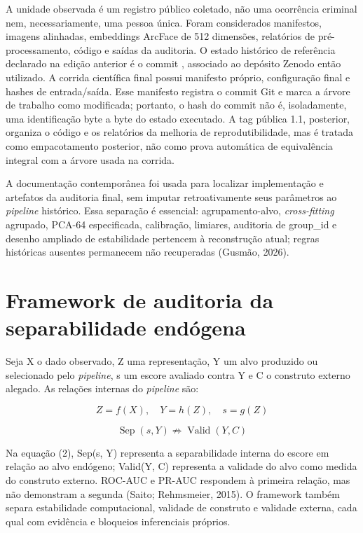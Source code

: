 A unidade observada é um registro público coletado, não uma ocorrência criminal nem, necessariamente, uma pessoa única. Foram considerados manifestos, imagens alinhadas, embeddings ArcFace de 512 dimensões, relatórios de pré-processamento, código e saídas da auditoria. O estado histórico de referência declarado na edição anterior é o commit , associado ao depósito Zenodo então utilizado. A corrida científica final possui manifesto próprio, configuração final e hashes de entrada/saída. Esse manifesto registra o commit Git  e marca a árvore de trabalho como modificada; portanto, o hash do commit não é, isoladamente, uma identificação byte a byte do estado executado. A tag pública 1.1, posterior, organiza o código e os relatórios da melhoria de reprodutibilidade, mas é tratada como empacotamento posterior, não como prova automática de equivalência integral com a árvore usada na corrida.

A documentação contemporânea foi usada para localizar implementação e artefatos da auditoria final, sem imputar retroativamente seus parâmetros ao \emph{pipeline} histórico. Essa separação é essencial: agrupamento-alvo, \emph{cross-fitting} agrupado, PCA-64 especificada, calibração, limiares, auditoria de group\_id e desenho ampliado de estabilidade pertencem à reconstrução atual; regras históricas ausentes permanecem não recuperadas (Gusmão, 2026).

\section{Framework de auditoria da separabilidade endógena}

Seja X o dado observado, Z uma representação, Y um alvo produzido ou selecionado pelo \emph{pipeline}, s um escore avaliado contra Y e C o construto externo alegado. As relações internas do \emph{pipeline} são:

\begin{equation}\label{eq:pipeline} Z=f(X),\quad Y=h(Z),\quad s=g(Z) \end{equation}

\begin{equation}\label{eq:validade} \operatorname{Sep}(s,Y)\not\Rightarrow\operatorname{Valid}(Y,C) \end{equation}

Na equação (2), Sep(s, Y) representa a separabilidade interna do escore em relação ao alvo endógeno; Valid(Y, C) representa a validade do alvo como medida do construto externo. ROC-AUC e PR-AUC respondem à primeira relação, mas não demonstram a segunda (Saito; Rehmsmeier, 2015). O framework também separa estabilidade computacional, validade de construto e validade externa, cada qual com evidência e bloqueios inferenciais próprios.

